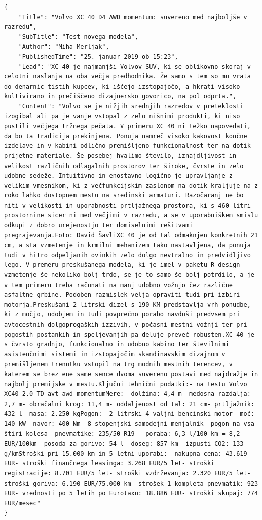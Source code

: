 \documentclass[runningheads]{llncs}
\begin{document}
\begin{lstlisting}[caption={Results for rtvslo website},captionpos=b, label={lst:label1}]
{
    "Title": "Volvo XC 40 D4 AWD momentum: suvereno med najboljše v razredu",
    "SubTitle": "Test novega modela",
    "Author": "Miha Merljak",
    "PublishedTime": "25. januar 2019 ob 15:23",
    "Lead": "XC 40 je najmanjši Volvov SUV, ki se oblikovno skoraj v celotni naslanja na oba večja predhodnika. Že samo s tem so mu vrata do denarnic tistih kupcev, ki iščejo izstopajočo, a hkrati visoko kultivirano in prečiščeno dizajnersko govorico, na pol odprta.",
    "Content": "Volvo se je nižjih srednjih razredov v preteklosti izogibal ali pa je vanje vstopal z zelo nišnimi produkti, ki niso pustili večjega tržnega pečata. V primeru XC 40 ni težko napovedati, da bo ta tradicija prekinjena. Ponuja namreč visoko kakovost končne izdelave in v kabini odlično premišljeno funkcionalnost ter na dotik prijetne materiale. Še posebej hvalimo število, iznajdljivost in velikost različnih odlagalnih prostorov ter široke, čvrste in zelo udobne sedeže. Intuitivno in enostavno logično je upravljanje z velikim vmesnikom, ki z večfunkcijskim zaslonom na dotik kraljuje na z roko lahko dostopnem mestu na sredinski armaturi. Razočaranj ne bo niti v velikosti in uporabnosti prtljažnega prostora, ki s 460 litri prostornine sicer ni med večjimi v razredu, a se v uporabniškem smislu odkupi z dobro urejenostjo ter domiselnimi rešitvami pregrajevanja.Foto: David ŠavliXC 40 je od tal odmaknjen konkretnih 21 cm, a sta vzmetenje in krmilni mehanizem tako nastavljena, da ponuja tudi v hitro odpeljanih ovinkih zelo dolgo nevtralno in predvidljivo lego. V premeru preskušanega modela, ki je imel v paketu R design vzmetenje še nekoliko bolj trdo, se je to samo še bolj potrdilo, a je v tem primeru treba računati na manj udobno vožnjo čez različne asfaltne grbine. Podoben razmislek velja opraviti tudi pri izbiri motorja.Preskušani 2-litrski dizel s 190 KM predstavlja vrh ponudbe, ki z močjo, udobjem in tudi povprečno porabo navduši predvsem pri avtocestnih dolgoprogaških izzivih, v počasni mestni vožnji ter pri pogostih postankih in speljevanjih pa deluje preveč robusten.XC 40 je s čvrsto gradnjo, funkcionalno in udobno kabino ter številnimi asistenčnimi sistemi in izstopajočim skandinavskim dizajnom v premišljenem trenutku vstopil na trg modnih mestnih terencev, v katerem se brez ene same sence dvoma suvereno postavi med najdražje in najbolj premijske v mestu.Ključni tehnični podatki:- na testu Volvo XC40 2.0 TD avt awd momentumMere:- dolžina: 4,4 m- medosna razdalja: 2,7 m- obračalni krog: 11,4 m- oddaljenost od tal: 21 cm- prtljažnik: 432 l- masa: 2.250 kgPogon:- 2-litrski 4-valjni bencinski motor- moč: 140 kW- navor: 400 Nm- 8-stopenjski samodejni menjalnik- pogon na vsa štiri kolesa- pnevmatike: 235/50 R19 - poraba: 6,3 l/100 km = 8,2 EUR/100km- posoda za gorivo: 54 l- doseg: 857 km- izpusti CO2: 133 g/kmStroški pri 15.000 km in 5-letni uporabi:- nakupna cena: 43.619 EUR- stroški finančnega leasinga: 3.268 EUR/5 let- stroški registracije: 8.701 EUR/5 let- stroški vzdrževanja: 2.320 EUR/5 let- stroški goriva: 6.190 EUR/75.000 km- strošek 1 kompleta pnevmatik: 923 EUR- vrednosti po 5 letih po Eurotaxu: 18.886 EUR- stroški skupaj: 774 EUR/mesec"
}
\end{lstlisting}
\end{document}
